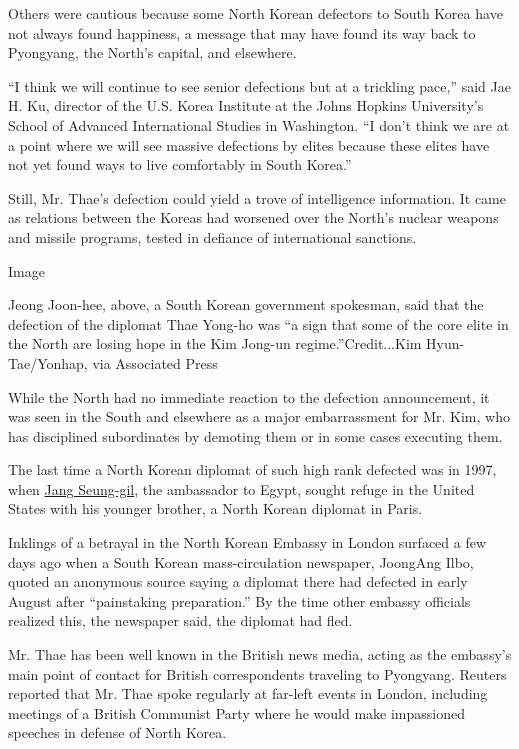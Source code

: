 Others were cautious because some North Korean defectors to South Korea
have not always found happiness, a message that may have found its way
back to Pyongyang, the North's capital, and elsewhere.

``I think we will continue to see senior defections but at a trickling
pace,'' said Jae H. Ku, director of the U.S. Korea Institute at the
Johns Hopkins University's School of Advanced International Studies in
Washington. ``I don't think we are at a point where we will see massive
defections by elites because these elites have not yet found ways to
live comfortably in South Korea.''

Still, Mr. Thae's defection could yield a trove of intelligence
information. It came as relations between the Koreas had worsened over
the North's nuclear weapons and missile programs, tested in defiance of
international sanctions.

Image

Jeong Joon-hee, above, a South Korean government spokesman, said that
the defection of the diplomat Thae Yong-ho was ``a sign that some of the
core elite in the North are losing hope in the Kim Jong-un
regime.''Credit...Kim Hyun-Tae/Yonhap, via Associated Press

While the North had no immediate reaction to the defection announcement,
it was seen in the South and elsewhere as a major embarrassment for Mr.
Kim, who has disciplined subordinates by demoting them or in some cases
executing them.

The last time a North Korean diplomat of such high rank defected was in
1997, when
\href{http://www.nytimes.com/1997/08/25/world/north-korean-envoy-said-to-defect-in-cairo.html}{Jang
Seung-gil}, the ambassador to Egypt, sought refuge in the United States
with his younger brother, a North Korean diplomat in Paris.

Inklings of a betrayal in the North Korean Embassy in London surfaced a
few days ago when a South Korean mass-circulation newspaper, JoongAng
Ilbo, quoted an anonymous source saying a diplomat there had defected in
early August after ``painstaking preparation.'' By the time other
embassy officials realized this, the newspaper said, the diplomat had
fled.

Mr. Thae has been well known in the British news media, acting as the
embassy's main point of contact for British correspondents traveling to
Pyongyang. Reuters reported that Mr. Thae spoke regularly at far-left
events in London, including meetings of a British Communist Party where
he would make impassioned speeches in defense of North Korea.


